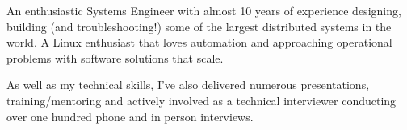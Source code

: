 

\begin{cvparagraph}

An enthusiastic Systems Engineer with almost 10 years of experience designing, building (and troubleshooting!) some of the largest distributed systems in the world. A Linux enthusiast that loves automation and approaching operational problems with software solutions that scale.

As well as my technical skills, I've also delivered numerous presentations, training/mentoring and actively involved as a technical interviewer conducting over one hundred phone and in person interviews.

\end{cvparagraph}
